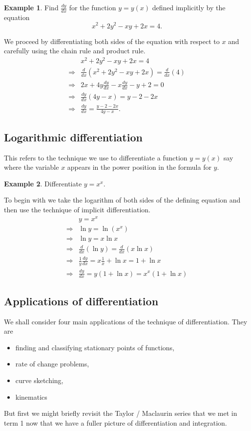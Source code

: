\documentclass[extrafontsizes, twoside, a4paper]{memoir}
\theoremstyle{plain}%
\theoremstyle{definition}
\newtheorem{exmp}{Example}[chapter]
\theoremstyle{remark}
\begin{document}
\begin{exmp}
Find $\frac{dy}{dx}$ for the function $y=y(x)$ defined implicitly by the equation
$$ x^2 + 2y^2 - xy + 2x =4.$$

We proceed by differentiating both sides of the equation with respect to $x$ and carefully using the chain rule and product rule.
\begin{align*}
& x^2 + 2y^2 - xy + 2x =4 \\
\Rightarrow & \frac{d}{dx} (x^2 + 2y^2 - xy + 2x) = \frac{d}{dx} (4) \\
\Rightarrow & 2x + 4y \frac{dy}{dx} -x\frac{dy}{dx} - y + 2 = 0 \\
\Rightarrow & \frac{dy}{dx} ( 4y - x) = y - 2 - 2x \\
\Rightarrow & \frac{dy}{dx} = \frac{y - 2 - 2x}{4y-x}.
\end{align*}
\end{exmp}

\subsection{Logarithmic differentiation}
This refers to the technique we use to differentiate a function $y=y(x)$ say where the variable $x$ appears in the power position in the formula for $y$.

\begin{exmp}
Differentiate $y=x^x$.

To begin with we take the logarithm of both sides of the defining equation and then use the technique of implicit differentiation.
\begin{align*}
& y= x^x \\
\Rightarrow & \ln{y} = \ln{(x^x)} \\
\Rightarrow & \ln{y} = x \ln{x} \\
\Rightarrow & \frac{d}{dx} ( \ln{y})=\frac{d}{dx} (x \ln{x}) \\
\Rightarrow & \frac{1}{y} \frac{dy}{dx} = x \frac{1}{x} + \ln{x} = 1 + \ln{x} \\
\Rightarrow & \frac{dy}{dx} = y(1+\ln{x}) = x^x (1 + \ln{x})
\end{align*}
\end{exmp}

\subsection{Applications of differentiation}
We shall consider four main applications of the technique of differentiation. They are
\begin{itemize}
\item
finding and classifying stationary points of functions,
\item
rate of change problems,
\item
curve sketching,
\item
kinematics
\end{itemize}
But first we might briefly revisit the Taylor / Maclaurin series that we met in term 1 now that we have a fuller picture of differentiation and integration.
\end{document}
